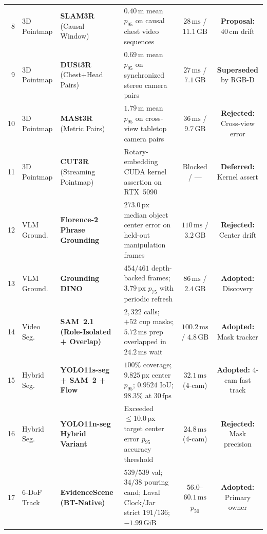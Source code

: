 \documentclass{evidencescene}
\begin{document}
\begin{table}[t]
{\begin{tabular}{@{}rllp{6.5cm}cc@{}}
        8 & 3D Pointmap & \textbf{SLAM3R} (Causal Window)~\cite{liu2025slam3r} & $0.40\,\mathrm{m}$ mean $p_{95}$ on causal chest video sequences & $28\,\mathrm{ms}$ / $11.1\,\mathrm{GB}$ & \textbf{Proposal:} $40\,\mathrm{cm}$ drift \\
        9 & 3D Pointmap & \textbf{DUSt3R} (Chest+Head Pairs)~\cite{wang2024dust3r} & $0.69\,\mathrm{m}$ mean $p_{95}$ on synchronized stereo camera pairs & $27\,\mathrm{ms}$ / $7.1\,\mathrm{GB}$ & \textbf{Superseded} by RGB-D \\
        10 & 3D Pointmap & \textbf{MASt3R} (Metric Pairs)~\cite{leroy2024mast3r} & $1.79\,\mathrm{m}$ mean $p_{95}$ on cross-view tabletop camera pairs & $36\,\mathrm{ms}$ / $9.7\,\mathrm{GB}$ & \textbf{Rejected:} Cross-view error \\
        11 & 3D Pointmap & \textbf{CUT3R} (Streaming Pointmap)~\cite{wang2025cut3r} & Rotary-embedding CUDA kernel assertion on RTX~5090 & Blocked / --- & \textbf{Deferred:} Kernel assert \\
        12 & VLM Ground. & \textbf{Florence-2 Phrase Grounding}~\cite{xiao2024florence2} & $273.0\,\mathrm{px}$ median object center error on held-out manipulation frames & $110\,\mathrm{ms}$ / $3.2\,\mathrm{GB}$ & \textbf{Rejected:} Center drift \\
        13 & VLM Ground. & \textbf{Grounding DINO}~\cite{liu2023grounding} & $454/461$ depth-backed frames; $3.79\,\mathrm{px}$ $p_{75}$ with periodic refresh & $86\,\mathrm{ms}$ / $2.4\,\mathrm{GB}$ & \textbf{Adopted:} Discovery \\
        \rowcolor{esrow}
        14 & Video Seg. & \textbf{SAM~2.1 (Role-Isolated + Overlap)}~\cite{ravi2024sam2} & $2{,}322$ calls; $+52$ cup masks; $5.72\,\mathrm{ms}$ prep overlapped in $24.2\,\mathrm{ms}$ wait & $100.2\,\mathrm{ms}$ / $4.8\,\mathrm{GB}$ & \textbf{Adopted:} Mask tracker \\
        15 & Hybrid Seg. & \textbf{YOLO11s-seg + SAM~2 + Flow}~\cite{jocher2024yolo11} & $100\%$ coverage; $9.825\,\mathrm{px}$ center $p_{95}$; $0.9524$ IoU; $98.3\%$ at $30\,\mathrm{fps}$ & $32.1\,\mathrm{ms}$ (4-cam) & \textbf{Adopted:} 4-cam fast track \\
        16 & Hybrid Seg. & \textbf{YOLO11n-seg Hybrid Variant}~\cite{jocher2024yolo11} & Exceeded $\le 10.0\,\mathrm{px}$ target center error $p_{95}$ accuracy threshold & $24.8\,\mathrm{ms}$ (4-cam) & \textbf{Rejected:} Mask precision \\
        \rowcolor{esrow}
        17 & 6-DoF Track & \textbf{EvidenceScene (BT-Native)}~\cite{bundletrack} & $539/539$ val; $34/38$ pouring cand; Laval Clock/Jar strict $191/136$; $-1.99\,\mathrm{GiB}$ & $56.0$--$60.1\,\mathrm{ms}$ $p_{50}$ & \textbf{Adopted:} Primary owner \\

\end{tabular}}
\end{table}
\end{document}
